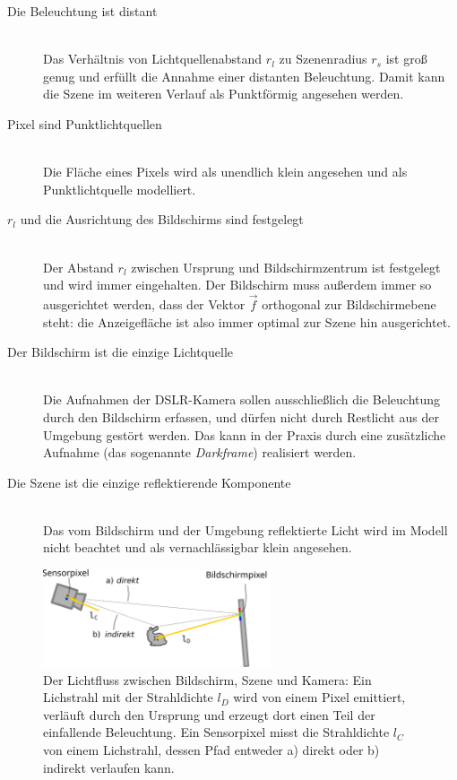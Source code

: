    \begin{description}
 
      \item[Die Beleuchtung ist distant] \hfill \\
           Das Verhältnis von Lichtquellenabstand  $r_l$ zu Szenenradius $r_s$  ist groß genug und erfüllt die Annahme einer distanten Beleuchtung.
           Damit kann die Szene im weiteren Verlauf als Punktförmig angesehen werden.
  
      \item[Pixel sind Punktlichtquellen] \hfill \\
            Die Fläche eines Pixels wird als unendlich klein angesehen und als Punktlichtquelle modelliert.  
     
      \item[$r_l$ und die Ausrichtung des Bildschirms sind festgelegt] \hfill \\
           Der Abstand $r_l$ zwischen Ursprung und Bildschirmzentrum ist festgelegt und wird immer eingehalten.
           Der Bildschirm muss außerdem immer so ausgerichtet werden, dass der Vektor $\vec{f}$ orthogonal zur Bildschirmebene steht: die Anzeigefläche ist also immer optimal zur Szene hin ausgerichtet. 
           
      \item[Der Bildschirm ist die einzige Lichtquelle] \hfill \\
           Die Aufnahmen der DSLR-Kamera sollen ausschließlich die Beleuchtung durch den Bildschirm erfassen, und dürfen nicht durch Restlicht aus der Umgebung gestört werden.
           Das kann in der Praxis durch eine zusätzliche Aufnahme (das sogenannte \emph{Darkframe}) realisiert werden.

      \item[Die Szene ist die einzige reflektierende Komponente] \hfill \\
           Das vom Bildschirm und der Umgebung reflektierte Licht wird im Modell nicht beachtet und als vernachlässigbar klein angesehen.

    \end{description}
       \begin{figure}[H]
    \centering
    \includegraphics[width=0.6\textwidth]{../graphics/kalibrierung/radiometric_model.svg}
    \caption[Lichtfluss zwischen Bildschirm, Szene und Kamera]{ 
     Der Lichtfluss zwischen Bildschirm, Szene und Kamera:  
     Ein Lichstrahl mit der Strahldichte $l_D$ wird von einem Pixel emittiert, verläuft durch den Ursprung und erzeugt dort einen Teil der einfallende Beleuchtung.
     Ein Sensorpixel misst die Strahldichte $l_C$ von einem Lichstrahl, dessen Pfad entweder a) direkt oder b) indirekt verlaufen kann.}
    \label{fig:radiometric_model}
   \end{figure}


